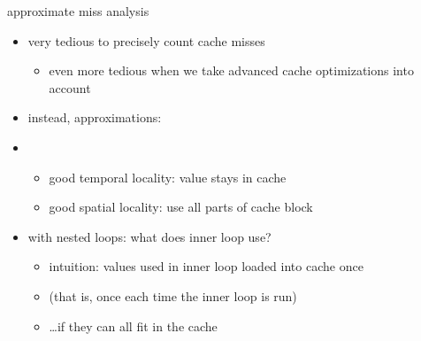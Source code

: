 \begin{frame}{approximate miss analysis}
    \begin{itemize}
    \item very tedious to precisely count cache misses
        \begin{itemize}
        \item even more tedious when we take advanced cache optimizations into account
        \end{itemize}
    \vspace{.5cm}
    \item instead, approximations:
    \item {}
        \begin{itemize}
        \item good temporal locality: value stays in cache
        \item good spatial locality: use all parts of cache block
        \end{itemize}
    \item with nested loops: what does inner loop use?
        \begin{itemize}
        \item intuition: values used in inner loop loaded into cache once 
        \item (that is, once each time the inner loop is run)
        \item \ldots if they can all fit in the cache
        \end{itemize}
    \end{itemize}
\end{frame}
